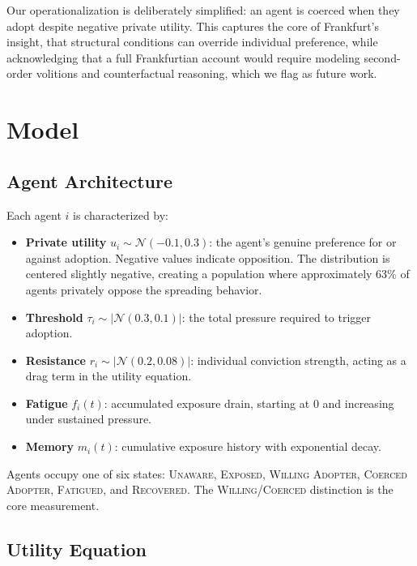 \documentclass[11pt, a4paper]{article}
\begin{document}
Our operationalization is deliberately simplified: an agent is coerced when they adopt despite negative private utility. This captures the core of Frankfurt's insight, that structural conditions can override individual preference, while acknowledging that a full Frankfurtian account would require modeling second-order volitions and counterfactual reasoning, which we flag as future work.

\section{Model}
\label{sec:model}

\subsection{Agent Architecture}

Each agent $i$ is characterized by:

\begin{itemize}
    \item \textbf{Private utility} $u_i \sim \mathcal{N}(-0.1, 0.3)$: the agent's genuine preference for or against adoption. Negative values indicate opposition. The distribution is centered slightly negative, creating a population where approximately 63\% of agents privately oppose the spreading behavior.
    \item \textbf{Threshold} $\tau_i \sim |\mathcal{N}(0.3, 0.1)|$: the total pressure required to trigger adoption.
    \item \textbf{Resistance} $r_i \sim |\mathcal{N}(0.2, 0.08)|$: individual conviction strength, acting as a drag term in the utility equation.
    \item \textbf{Fatigue} $f_i(t)$: accumulated exposure drain, starting at 0 and increasing under sustained pressure.
    \item \textbf{Memory} $m_i(t)$: cumulative exposure history with exponential decay.
\end{itemize}

Agents occupy one of six states: \textsc{Unaware}, \textsc{Exposed}, \textsc{Willing Adopter}, \textsc{Coerced Adopter}, \textsc{Fatigued}, and \textsc{Recovered}. The \textsc{Willing}/\textsc{Coerced} distinction is the core measurement.

\subsection{Utility Equation}
\end{document}

